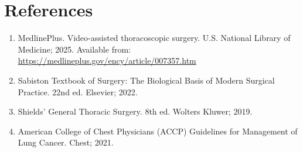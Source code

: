 \section*{References}
\begin{enumerate}
  \item MedlinePlus. Video-assisted thoracoscopic surgery. U.S. National Library of Medicine; 2025. Available from: \url{https://medlineplus.gov/ency/article/007357.htm}
  
  \item Sabiston Textbook of Surgery: The Biological Basis of Modern Surgical Practice. 22nd ed. Elsevier; 2022.
  
  \item Shields' General Thoracic Surgery. 8th ed. Wolters Kluwer; 2019.
  
  \item American College of Chest Physicians (ACCP) Guidelines for Management of Lung Cancer. Chest; 2021.
\end{enumerate}

\clearpage
